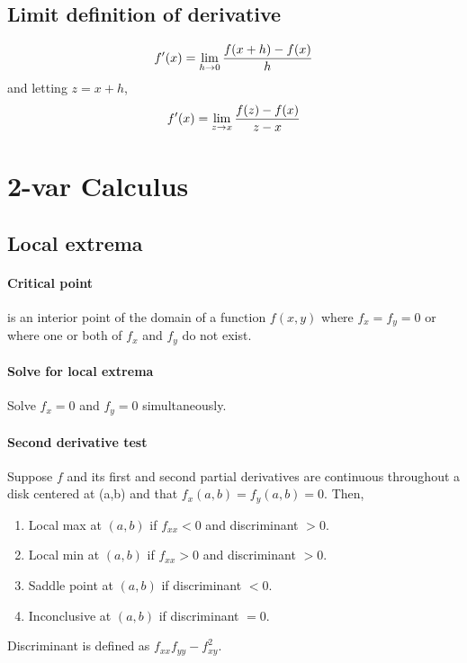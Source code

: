 \documentclass[a4paper]{article}
\begin{document}
\begin{multicols*}{3}
    \subsection*{Limit definition of derivative}
      \begin{equation*}
        f'(x) = \lim_{h \rightarrow 0} \dfrac{f(x+h)-f(x)}{h}
      \end{equation*}
      and letting $z = x+h$,
      \begin{equation*}
        f'(x) = \lim_{z \rightarrow x} \dfrac{f(z)-f(x)}{z-x}
      \end{equation*}
  \section*{2-var Calculus}
    \subsection*{Local extrema}
      \paragraph{Critical point}
        is an interior point of the domain of a function $f(x,y)$ where $f_x = f_y = 0$ or where one or both of $f_x$ and $f_y$ do not exist.
      \paragraph{Solve for local extrema}
        Solve $f_x = 0$ and $f_y = 0$ simultaneously.
      \paragraph{Second derivative test}
        Suppose $f$ and its first and second partial derivatives are continuous throughout a disk centered at (a,b) and that $f_x(a,b) = f_y(a,b) = 0$. Then,
        \begin{enumerate}
          \item Local max at $(a,b)$ if $f_{xx} < 0$ and discriminant $> 0$.
          \item Local min at $(a,b)$ if $f_{xx} > 0$ and discriminant $> 0$.
          \item Saddle point at $(a,b)$ if discriminant $< 0$.
          \item Inconclusive at $(a,b)$ if discriminant $= 0$.
        \end{enumerate}
        Discriminant is defined as $f_{xx} f_{yy} - f_{xy}^2$.

\end{multicols*}
\end{document}
